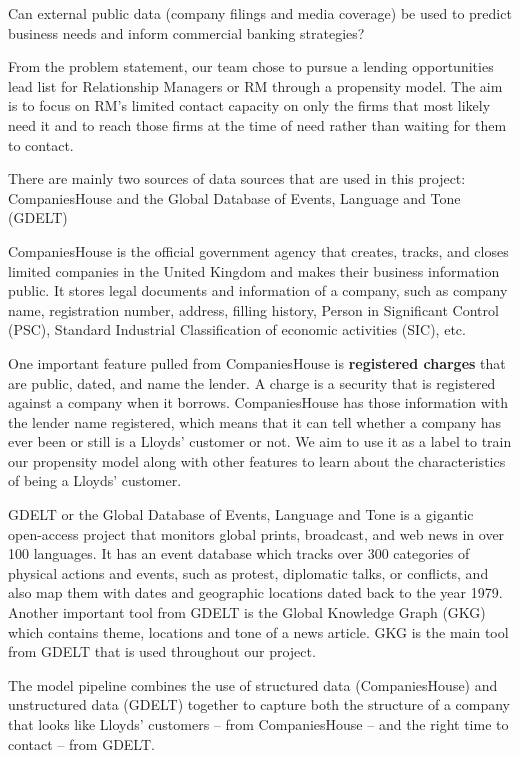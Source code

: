 \documentclass[ %
                    author={Natchalin Iwsakul \\ Inkaphol Siriwongwattana \\ Tanaphan Kummaraphat \\ Patorn Srisupap},
                supervisor={Fernando Moreno-Pino},
                    degree={MSc},
                     title={Propensity Modelling for SME Commercial Lending Using Open Public Data},
                  subtitle={Companies House filings and GDELT media coverage as predictors of first-time borrowing},
                      type={},
                      year={2026}]{dissertation}
\begin{document}
\begin{displayquote}
Can external public data (company filings and media coverage) be used to predict business needs and inform commercial banking strategies?
\end{displayquote}

From the problem statement, our team chose to pursue a lending opportunities lead list for Relationship Managers or RM through a propensity model. The aim is to focus on RM's limited contact capacity on only the firms that most likely need it and to reach those firms at the time of need rather than waiting for them to contact.

There are mainly two sources of data sources that are used in this project: CompaniesHouse and the Global Database of Events, Language and Tone (GDELT)

CompaniesHouse is the official government agency that creates, tracks, and closes limited companies in the United Kingdom and makes their business information public. It stores legal documents and information of a company, such as company name, registration number, address, filling history, Person in Significant Control (PSC), Standard Industrial Classification of economic activities (SIC), etc. 
 
One important feature pulled from CompaniesHouse is \textbf{registered charges} that are public, dated, and name the lender. A charge is a security that is registered against a company when it borrows. CompaniesHouse has those information with the lender name registered, which means that it can tell whether a company has ever been or still is a Lloyds' customer or not. We aim to use it as a label to train our propensity model along with other features to learn about the characteristics of being a Lloyds' customer.

GDELT or the Global Database of Events, Language and Tone is a gigantic open-access project that monitors global prints, broadcast, and web news in over 100 languages. It has an event database which tracks over 300 categories of physical actions and events, such as protest, diplomatic talks, or conflicts, and also map them with dates and geographic locations dated back to the year 1979. Another important tool from GDELT is the Global Knowledge Graph (GKG) which contains theme, locations and tone of a news article. GKG is the main tool from GDELT that is used throughout our project.

The model pipeline combines the use of structured data (CompaniesHouse) and unstructured data (GDELT) together to capture both the structure of a company that looks like Lloyds' customers -- from CompaniesHouse -- and the right time to contact -- from GDELT.
\end{document}
